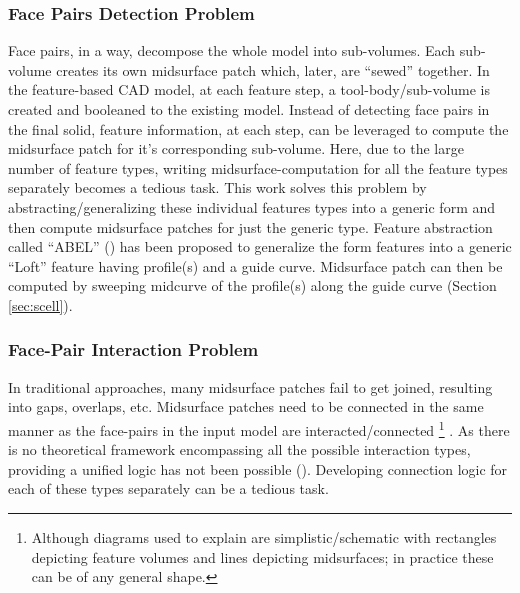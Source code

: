	
\subsubsection{Face Pairs Detection Problem}  \label{sec:facepairdetection}
Face pairs, in a way, decompose the whole model into sub-volumes. Each sub-volume creates its own midsurface patch which, later, are ``sewed'' together. In the feature-based CAD model, at each feature step, a tool-body/sub-volume is created and booleaned to the existing model.  Instead of detecting face pairs in the final solid,  feature information, at each step, can be leveraged to compute the midsurface patch for it's corresponding sub-volume.    Here, due to the large number of feature types, writing midsurface-computation for all the feature types separately becomes a tedious task. This work solves this problem by abstracting/generalizing these individual features types into a generic form and then compute midsurface patches for just the generic type. Feature abstraction called ``ABEL'' (\cite{YogeshIITG2014})  has been proposed to generalize the form features into a generic ``Loft'' feature having profile(s) and a guide curve. Midsurface patch can then be computed by sweeping midcurve of the profile(s) along the guide curve (Section \ref{sec:scell}). %


\subsubsection{Face-Pair Interaction Problem} \label{sec:facepairinteraction}

In traditional approaches, many midsurface patches fail to get joined, resulting into gaps, overlaps, etc. Midsurface patches need to be connected in the same manner as the face-pairs in the input model are interacted/connected \footnote{Although diagrams used to explain are simplistic/schematic with rectangles depicting feature volumes and lines depicting midsurfaces; in practice these can be of any general shape.} . As there is no theoretical framework encompassing all the possible interaction types, providing a unified logic has not been possible  (\cite{Stolt2006}). Developing connection logic for each of these types separately can be a tedious task. 


